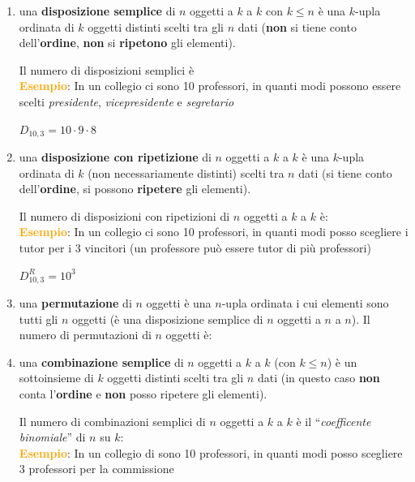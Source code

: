 \begin{enumerate}[nosep]
    \item una \textbf{disposizione semplice} di $n$ oggetti a $k$ a $k$ con $k \leq n$ è una $k$-upla ordinata di $k$ oggetti distinti scelti tra gli $n$ dati (\textbf{non} si tiene conto dell'\textbf{ordine}, \textbf{non} si \textbf{ripetono} gli elementi).
    \begin{boxA}
        Il numero di disposizioni semplici è  \\
        \textcolor{orange}{\textbf{Esempio}}: In un collegio ci sono 10 professori, in quanti modi possono essere scelti \textit{presidente}, \textit{vicepresidente} e \textit{segretario}
        
        {\centering
            $D_{10, 3} = 10 \cdot 9 \cdot 8$
        \par}
    \end{boxA}
    \item una \textbf{disposizione con ripetizione} di $n$ oggetti a $k$ a $k$ è una $k$-upla ordinata di $k$ (non necessariamente distinti) scelti tra $n$ dati (si tiene conto dell'\textbf{ordine}, si possono \textbf{ripetere} gli elementi).
    \begin{boxA}
        Il numero di disposizioni con ripetizioni di $n$ oggetti a $k$ a $k$ è:  \\
        \textcolor{orange}{\textbf{Esempio}}: In un collegio ci sono 10 professori, in quanti modi posso scegliere i tutor per i 3 vincitori (un professore può essere tutor di più professori)

        {\centering
            $D^R_{10,3} = 10^3$
        \par}
    \end{boxA}
    
    \newpage
    \item una \textbf{permutazione} di $n$ oggetti è una $n$-upla ordinata i cui elementi sono tutti gli $n$ oggetti (è una disposizione semplice di $n$ oggetti a $n$ a $n$). Il numero di permutazioni di $n$ oggetti è:
    
    {\centering
    \par}
    
    \item una \textbf{combinazione semplice} di $n$ oggetti a $k$ a $k$ (con $k \leq n$) è un sottoinsieme di $k$ oggetti distinti scelti tra gli $n$ dati (in questo caso \textbf{non} conta l'\textbf{ordine} e \textbf{non} posso ripetere gli elementi).
    \begin{boxA}
        Il numero di combinazioni semplici di $n$ oggetti a $k$ a $k$ è il ``\textit{coefficente binomiale}'' di $n$ su $k$:  \\
        \textcolor{orange}{\textbf{Esempio}}: In un collegio di sono 10 professori, in quanti modi posso scegliere 3 professori per la commissione


\end{boxA}
\end{enumerate}
